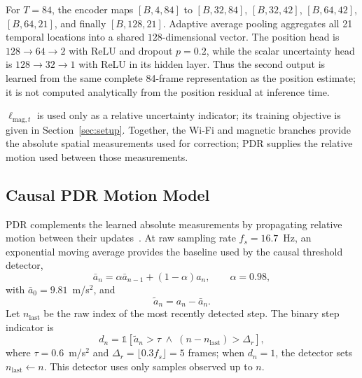 \documentclass[conference]{IEEEtran}
\begin{document}
For $T=84$, the encoder maps $[B,4,84]$ to $[B,32,84]$, $[B,32,42]$, $[B,64,42]$, $[B,64,21]$, and finally $[B,128,21]$. Adaptive average pooling aggregates all 21 temporal locations into a shared $128$-dimensional vector. The position head is $128\!\to\!64\!\to\!2$ with ReLU and dropout $p=0.2$, while the scalar uncertainty head is $128\!\to\!32\!\to\!1$ with ReLU in its hidden layer. Thus the second output is learned from the same complete 84-frame representation as the position estimate; it is not computed analytically from the position residual at inference time.

$\ell_{\mathrm{mag},t}$ is used only as a relative uncertainty indicator; its training objective is given in Section~\ref{sec:setup}. Together, the Wi-Fi and magnetic branches provide the absolute spatial measurements used for correction; PDR supplies the relative motion used between those measurements.

\subsection{Causal PDR Motion Model}\label{sec:pdr}

PDR complements the learned absolute measurements by propagating relative motion between their updates~\cite{nnwifipdr,axesmapping}. At raw sampling rate $f_s=16.7$~Hz, an exponential moving average provides the baseline used by the causal threshold detector,
\begin{equation}
\bar{a}_n = \alpha\bar{a}_{n-1} + (1-\alpha)a_n,
\qquad \alpha=0.98,
\label{eq:lpf}
\end{equation}
with $\bar{a}_0=9.81$~m/s$^2$, and
\begin{equation}
\tilde{a}_n=a_n-\bar{a}_n.
\label{eq:hpf}
\end{equation}
Let $n_{\mathrm{last}}$ be the raw index of the most recently detected step. The binary step indicator is
\begin{equation}
d_n=\mathbb{1}\!\left[
\tilde{a}_n>\tau
\;\land\;
(n-n_{\mathrm{last}})>\Delta_r
\right],
\label{eq:step_trigger}
\end{equation}
where $\tau=0.6$~m/s$^2$ and $\Delta_r=\lfloor0.3f_s\rfloor=5$ frames; when $d_n=1$, the detector sets $n_{\mathrm{last}}\leftarrow n$. This detector uses only samples observed up to $n$.
\end{document}
